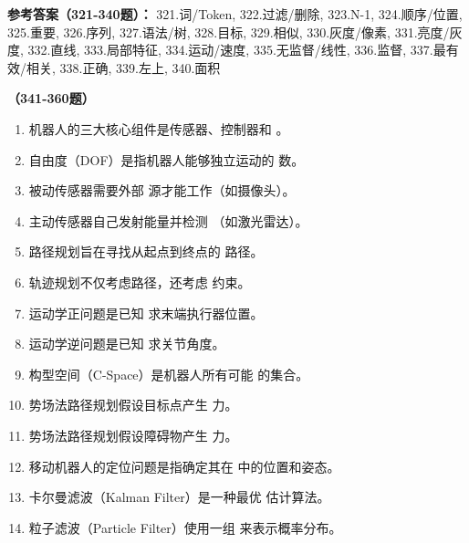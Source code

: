 \textbf{参考答案（321-340题）：}
321.词/Token, 322.过滤/删除, 323.N-1, 324.顺序/位置, 325.重要, 326.序列, 327.语法/树, 328.目标, 329.相似, 330.灰度/像素, 331.亮度/灰度, 332.直线, 333.局部特征, 334.运动/速度, 335.无监督/线性, 336.监督, 337.最有效/相关, 338.正确, 339.左上, 340.面积

\vspace{1em}
\textbf{（341-360题）}
\begin{enumerate}[resume,leftmargin=2em,itemsep=1pt]
\item 机器人的三大核心组件是传感器、控制器和 \underline{\hspace{3em}}。
\item 自由度（DOF）是指机器人能够独立运动的 \underline{\hspace{3em}} 数。
\item 被动传感器需要外部 \underline{\hspace{3em}} 源才能工作（如摄像头）。
\item 主动传感器自己发射能量并检测 \underline{\hspace{3em}}（如激光雷达）。
\item 路径规划旨在寻找从起点到终点的 \underline{\hspace{3em}} 路径。
\item 轨迹规划不仅考虑路径，还考虑 \underline{\hspace{3em}} 约束。
\item 运动学正问题是已知 \underline{\hspace{3em}} 求末端执行器位置。
\item 运动学逆问题是已知 \underline{\hspace{3em}} 求关节角度。
\item 构型空间（C-Space）是机器人所有可能 \underline{\hspace{3em}} 的集合。
\item 势场法路径规划假设目标点产生 \underline{\hspace{3em}} 力。
\item 势场法路径规划假设障碍物产生 \underline{\hspace{3em}} 力。
\item 移动机器人的定位问题是指确定其在 \underline{\hspace{3em}} 中的位置和姿态。
\item 卡尔曼滤波（Kalman Filter）是一种最优 \underline{\hspace{3em}} 估计算法。
\item 粒子滤波（Particle Filter）使用一组 \underline{\hspace{3em}} 来表示概率分布。

\end{enumerate}
